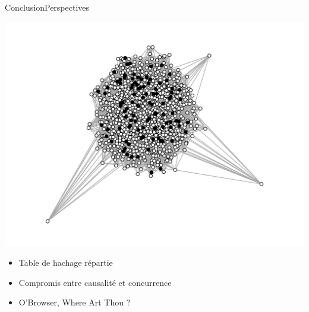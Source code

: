 \begin{frame}{Conclusion}{Perspectives}
\begin{minipage}{0.325\textwidth}
    \includegraphics[width=1.2\textwidth]{img/graphC.png}
  \end{minipage}


  \begin{minipage}{0.45\textwidth}
  \begin{itemize}
  \item Table de hachage répartie
  \end{itemize}
  \end{minipage}
  \hfill
  \begin{minipage}{0.45\textwidth}
  \begin{center}
    
  \end{center}
  \end{minipage}

  \begin{itemize}
  \item Compromis entre causalité et concurrence
  \item O'Browser, Where Art Thou ?
  \end{itemize}

\end{frame}

